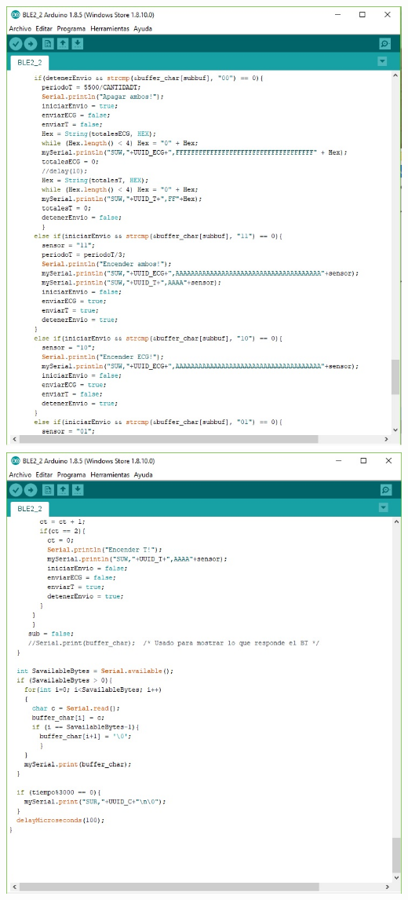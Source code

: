 \includegraphics[width=1\textwidth]{figura/anexos/code9.jpg}
\centering
\includegraphics[width=1\textwidth]{figura/anexos/code10.jpg}
